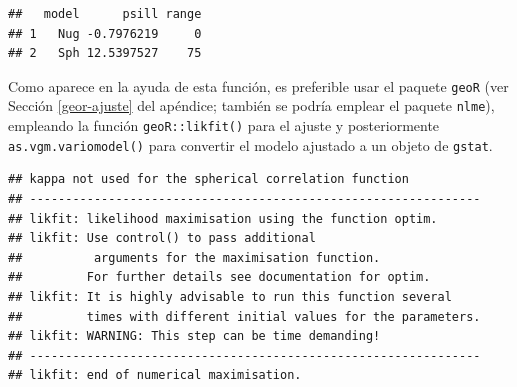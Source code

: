\documentclass[
  spanish,
]{book}
\newenvironment{Shaded}{\begin{snugshade}}{\end{snugshade}}
\newcommand{\AttributeTok}[1]{\textcolor[rgb]{0.77,0.63,0.00}{#1}}
\newcommand{\DecValTok}[1]{\textcolor[rgb]{0.00,0.00,0.81}{#1}}
\newcommand{\FloatTok}[1]{\textcolor[rgb]{0.00,0.00,0.81}{#1}}
\newcommand{\FunctionTok}[1]{\textcolor[rgb]{0.00,0.00,0.00}{#1}}
\newcommand{\NormalTok}[1]{#1}
\newcommand{\OtherTok}[1]{\textcolor[rgb]{0.56,0.35,0.01}{#1}}
\newcommand{\SpecialCharTok}[1]{\textcolor[rgb]{0.00,0.00,0.00}{#1}}
\newcommand{\StringTok}[1]{\textcolor[rgb]{0.31,0.60,0.02}{#1}}
\theoremstyle{break}
\theoremstyle{definition}
\theoremstyle{definition}
\theoremstyle{definition}
\theoremstyle{definition}
\theoremstyle{remark}
\begin{document}
\begin{verbatim}
##   model      psill range
## 1   Nug -0.7976219     0
## 2   Sph 12.5397527    75
\end{verbatim}

Como aparece en la ayuda de esta función, es preferible usar el paquete \texttt{geoR} (ver Sección \ref{geor-ajuste} del apéndice; también se podría emplear el paquete \texttt{nlme}), empleando la función \texttt{geoR::likfit()} para el ajuste y posteriormente \texttt{as.vgm.variomodel()} para convertir el modelo ajustado a un objeto de \texttt{gstat}.

\begin{Shaded}
\end{Shaded}

\begin{verbatim}
## kappa not used for the spherical correlation function
## ---------------------------------------------------------------
## likfit: likelihood maximisation using the function optim.
## likfit: Use control() to pass additional
##          arguments for the maximisation function.
##         For further details see documentation for optim.
## likfit: It is highly advisable to run this function several
##         times with different initial values for the parameters.
## likfit: WARNING: This step can be time demanding!
## ---------------------------------------------------------------
## likfit: end of numerical maximisation.
\end{verbatim}
\end{document}
